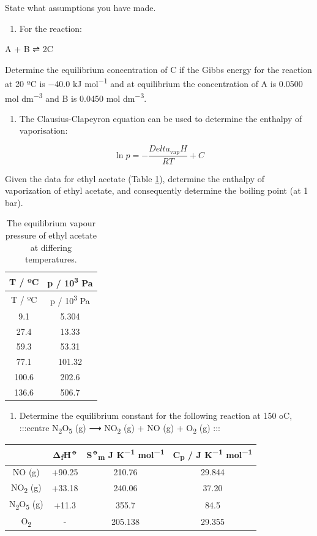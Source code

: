 \documentclass[
]{book}
\providecommand{\tightlist}{%
  \setlength{\itemsep}{0pt}\setlength{\parskip}{0pt}}
\begin{document}
State what assumptions you have made.

\begin{enumerate}
\def\labelenumi{\arabic{enumi}.}
\setcounter{enumi}{2}
\tightlist
\item
  For the reaction:
\end{enumerate}

A + B ⇌ 2C

Determine the equilibrium concentration of C if the Gibbs energy for the reaction at 20 ºC is −40.0 kJ mol\textsuperscript{−1} and at equilibrium the concentration of A is 0.0500 mol dm\textsuperscript{−3} and B is 0.0450 mol dm\textsuperscript{−3}.

\begin{enumerate}
\def\labelenumi{\arabic{enumi}.}
\setcounter{enumi}{3}
\tightlist
\item
  The Clausius-Clapeyron equation can be used to determine the enthalpy of vaporisation:
\end{enumerate}

\begin{equation*}
\ln p = -\frac{Delta _{\textrm{vap}}H}{RT}+C
\end{equation*}

Given the data for ethyl acetate (Table \ref{tab:ethylacetatedata}), determine the enthalpy of vaporization of ethyl acetate, and consequently determine the boiling point (at 1 bar).

\begin{longtable}[]{@{}cc@{}}
\caption{\label{tab:ethylacetatedata} The equilibrium vapour pressure of ethyl acetate at differing temperatures.}\tabularnewline
\toprule
T / ºC & p / 10\textsuperscript{3} Pa\tabularnewline
\midrule
\endfirsthead
\toprule
T / ºC & p / 10\textsuperscript{3} Pa\tabularnewline
\midrule
\endhead
9.1 & 5.304\tabularnewline
27.4 & 13.33\tabularnewline
59.3 & 53.31\tabularnewline
77.1 & 101.32\tabularnewline
100.6 & 202.6\tabularnewline
136.6 & 506.7\tabularnewline
\bottomrule
\end{longtable}

\begin{enumerate}
\def\labelenumi{\arabic{enumi}.}
\setcounter{enumi}{4}
\tightlist
\item
  Determine the equilibrium constant for the following reaction at 150 oC,
  :::centre
  N\textsubscript{2}O\textsubscript{5} (g) ⟶ NO\textsubscript{2} (g) + NO (g) + O\textsubscript{2} (g)
  :::
\end{enumerate}

\begin{longtable}[]{@{}cccc@{}}
\toprule
& Δ\textsubscript{f}H\textsuperscript{⦵} & S\textsuperscript{⦵}\textsubscript{m} J K\textsuperscript{−1} mol\textsuperscript{−1} & C\textsubscript{p} / J K\textsuperscript{−1} mol\textsuperscript{−1}\tabularnewline
\midrule
\endhead
NO (g) & +90.25 & 210.76 & 29.844\tabularnewline
NO\textsubscript{2} (g) & +33.18 & 240.06 & 37.20\tabularnewline
N\textsubscript{2}O\textsubscript{5} (g) & +11.3 & 355.7 & 84.5\tabularnewline
O\textsubscript{2} & - & 205.138 & 29.355\tabularnewline
\bottomrule
\end{longtable}
\end{document}
